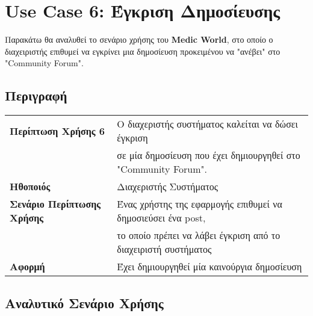 \documentclass{article}
\newcommand\T{\rule{0pt}{2.6ex}}       %
\newcommand\B{\rule[-1.2ex]{0pt}{0pt}}
\begin{document}
\section{Use Case 6: Έγκριση Δημοσίευσης}

Παρακάτω θα αναλυθεί το σενάριο χρήσης του \textbf{Medic World}, στο οποίο ο διαχειριστής επιθυμεί να εγκρίνει μια δημοσίευση προκειμένου να "ανέβει" στο "Community Forum".

\subsection{Περιγραφή}

\begin{center}
     \begin{tabular}{|l|l|}
     \hline
      \textbf{Περίπτωση Χρήσης 6} & Ο διαχεριστής συστήματος καλείται να δώσει έγκριση \T \\& σε μία δημοσίευση που έχει δημιουργηθεί στο "Community Forum". \B \\ 
      \hline
      \textbf{Ηθοποιός} & Διαχεριστής Συστήματος\T\B \\
      \hline
      \textbf{Σενάριο Περίπτωσης Χρήσης} & Ένας χρήστης της εφαρμογής επιθυμεί να δημοσιεύσει ένα post, \T \\&  το οποίο πρέπει να λάβει έγκριση από το διαχειριστή συστήματος\B \\
      \hline
      \textbf{Αφορμή} & Έχει δημιουργηθεί μία καινούργια δημοσίευση\T\B \\
      \hline
     \end{tabular}
 \end{center}
 
 \subsection{ Αναλυτικό Σενάριο Χρήσης}
 
\end{document}
